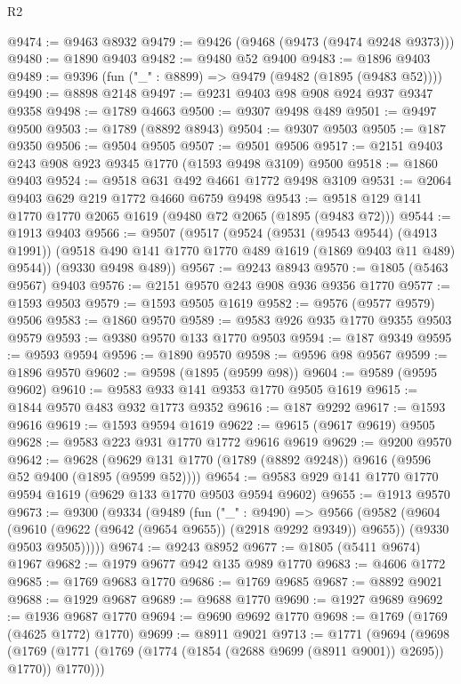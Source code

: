 \begin{lexlean}{R2}
\begin{coremodule}
@9474 := @9463 @8932
@9479 := @9426 (@9468 (@9473 (@9474 @9248 @9373)))
@9480 := @1890 @9403
@9482 := @9480 @52 @9400
@9483 := @1896 @9403
@9489 := @9396 (fun ("_" : @8899) => @9479 (@9482 (@1895 (@9483 @52))))
@9490 := @8898 @2148
@9497 := @9231 @9403 @98 @908 @924 @937 @9347 @9358
@9498 := @1789 @4663
@9500 := @9307 @9498 @489
@9501 := @9497 @9500
@9503 := @1789 (@8892 @8943)
@9504 := @9307 @9503
@9505 := @187 @9350
@9506 := @9504 @9505
@9507 := @9501 @9506
@9517 := @2151 @9403 @243 @908 @923 @9345 @1770 (@1593 @9498 @3109) @9500
@9518 := @1860 @9403
@9524 := @9518 @631 @492 @4661 @1772 @9498 @3109
@9531 := @2064 @9403 @629 @219 @1772 @4660 @6759 @9498
@9543 := @9518 @129 @141 @1770 @1770 @2065 @1619 (@9480 @72 @2065 (@1895 (@9483 @72)))
@9544 := @1913 @9403
@9566 := @9507
    (@9517
      (@9524
        (@9531 (@9543 @9544) (@4913 @1991))
        (@9518 @490 @141 @1770 @1770 @489 @1619 (@1869 @9403 @11 @489) @9544))
      (@9330 @9498 @489))
@9567 := @9243 @8943
@9570 := @1805 (@5463 @9567) @9403
@9576 := @2151 @9570 @243 @908 @936 @9356 @1770
@9577 := @1593 @9503
@9579 := @1593 @9505 @1619
@9582 := @9576 (@9577 @9579) @9506
@9583 := @1860 @9570
@9589 := @9583 @926 @935 @1770 @9355 @9503 @9579
@9593 := @9380 @9570 @133 @1770 @9503
@9594 := @187 @9349
@9595 := @9593 @9594
@9596 := @1890 @9570
@9598 := @9596 @98 @9567
@9599 := @1896 @9570
@9602 := @9598 (@1895 (@9599 @98))
@9604 := @9589 (@9595 @9602)
@9610 := @9583 @933 @141 @9353 @1770 @9505 @1619
@9615 := @1844 @9570 @483 @932 @1773 @9352
@9616 := @187 @9292
@9617 := @1593 @9616
@9619 := @1593 @9594 @1619
@9622 := @9615 (@9617 @9619) @9505
@9628 := @9583 @223 @931 @1770 @1772 @9616 @9619
@9629 := @9200 @9570
@9642 := @9628 (@9629 @131 @1770 (@1789 (@8892 @9248)) @9616 (@9596 @52 @9400 (@1895 (@9599 @52))))
@9654 := @9583 @929 @141 @1770 @1770 @9594 @1619 (@9629 @133 @1770 @9503 @9594 @9602)
@9655 := @1913 @9570
@9673 := @9300
    (@9334
      (@9489
        (fun ("_" : @9490) =>
        @9566
          (@9582
            (@9604 (@9610 (@9622 (@9642 (@9654 @9655)) (@2918 @9292 @9349)) @9655))
            (@9330 @9503 @9505)))))
@9674 := @9243 @8952
@9677 := @1805 (@5411 @9674) @1967
@9682 := @1979 @9677 @942 @135 @989 @1770
@9683 := @4606 @1772
@9685 := @1769 @9683 @1770
@9686 := @1769 @9685
@9687 := @8892 @9021
@9688 := @1929 @9687
@9689 := @9688 @1770
@9690 := @1927 @9689
@9692 := @1936 @9687 @1770
@9694 := @9690 @9692 @1770
@9698 := @1769 (@1769 (@4625 @1772) @1770)
@9699 := @8911 @9021
@9713 := @1771
    (@9694
      (@9698 (@1769 (@1771 (@1769 (@1774 (@1854 (@2688 @9699 (@8911 @9001)) @2695)) @1770)) @1770)))

\end{coremodule}
\end{lexlean}
